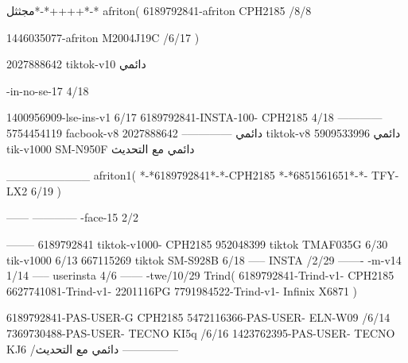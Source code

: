 مجثثل*-*++++*-*
afriton(
6189792841-afriton CPH2185  /8/8

1446035077-afriton M2004J19C  /6/17
)

2027888642 tiktok-v10
دائمي

-in-no-se-17 4/18

1400956909-lse-ins-v1 6/17
6189792841-INSTA-100- CPH2185 4/18
------------
5754454119 facbook-v8
دائمي
--------------
2027888642 tiktok-v8
دائمي
5909533996 tik-v1000  SM-N950F
دائمي مع التحديث

__________
afriton1(
*-*6189792841*-*-CPH2185
*-*6851561651*-*- TFY-LX2  6/19
)


------
------------
-face-15 2/2

--------
6189792841 tiktok-v1000- CPH2185 
952048399 tiktok TMAF035G  6/30
 tik-v1000   6/13
667115269 tiktok SM-S928B  6/18
-----
 INSTA /2/29
-------
-m-v14 1/14
-----
userinsta 4/6
------
-twe/10/29
Trind(
6189792841-Trind-v1- CPH2185 
6627741081-Trind-v1- 2201116PG \6
7791984522-Trind-v1- Infinix X6871 \6
)


6189792841-PAS-USER-G CPH2185 
5472116366-PAS-USER- ELN-W09  /6/14
7369730488-PAS-USER- TECNO KI5q  /6/16
1423762395-PAS-USER- TECNO KJ6  /دائمي مع التحديث
    ---------------
